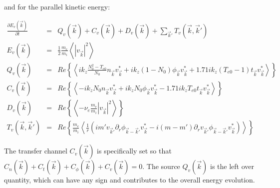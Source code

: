 \documentclass[showpacs,preprintnumbers,amsmath,amssymb,superscriptaddress]{revtex4}
\def\beqar{\begin{eqnarray}}
\def\eeqar{\end{eqnarray}}
\newcommand{\pdiff}[2]{\frac{\partial#1}{\partial#2}}
\newcommand{\pdr}{\partial_r}
\newcommand{\nue}{\nu_{e}}
\newcommand{\fmei}{\frac{m_e}{m_i}}
\begin{document}
and for the parallel kinetic energy:

\beqar
\label{Fourier_vpar_evolution}
\pdiff{E_v(\vec{k})}{t} & = & Q_v(\vec{k}) + C_v(\vec{k}) + D_v(\vec{k}) + \sum_{\vec{k}'} T_v(\vec{k},\vec{k}') \\
E_v(\vec{k}) & = & \frac{1}{2} \fmei \left< |v_{\vec{k}}|^2 \right> \\
Q_v(\vec{k}) & = & Re \left\{ \left<  i k_z \frac{N_0^2 - T_{e0}}{N_0} n_{\vec{k}} v_{\vec{k}}^* + i k_z (1 - N_0) \phi_{\vec{k}} v_{\vec{k}}^* + 1.71 i k_z (T_{e0} -1) t_{\vec{k}} v_{\vec{k}}^*   \right> \right\} \\
C_v(\vec{k}) & = & Re \left\{ \left< - i k_z N_0 n_{\vec{k}} v_{\vec{k}}^* + i k_z N_0 \phi_{\vec{k}} v_{\vec{k}}^* - 1.71 i k_z T_{e0} t_{\vec{k}} v_{\vec{k}}^*  \right> \right\} \\
D_v(\vec{k}) & = & Re \left\{ \left< - \nue \fmei |v_{\vec{k}}|^2   \right> \right\} \\
T_v(\vec{k},\vec{k}') & = & Re \left\{ \fmei \left< \frac{1}{r} \left( i m' v_{\vec{k}'} \pdr \phi_{\vec{k}-\vec{k}'} v_{\vec{k}}^*  - i (m - m') \pdr v_{\vec{k}'} \phi_{\vec{k}-\vec{k}'} v_{\vec{k}}^*        \right) \right> \right\}
\eeqar

The transfer channel $C_v(\vec{k})$ is specifically set so that $C_n(\vec{k}) + C_t(\vec{k}) + C_\phi(\vec{k}) + C_v(\vec{k}) = 0$. 
The source $Q_v(\vec{k})$ is the left over quantity, which can have any sign and contributes to the overall energy evolution.





%



%
%
\end{document}
